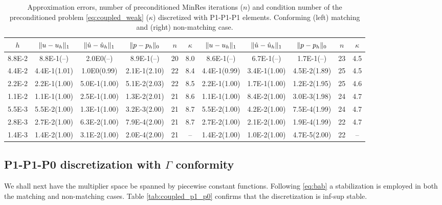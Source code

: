 \documentclass[r]{siamart171218}
\begin{document}
\begin{table}
  \begin{center}
    \scriptsize{
  \begin{tabular}{c|ccc|c|c||ccc|c|c}
    \hline
    $h$ & $\lVert{u-u_h}\rVert_1$ & $\lVert{\hat{u}-\hat{u}_h}\rVert_1$ & $\lVert{p-p_h}\rVert_0$ & $n$ & $\kappa$
        & $\lVert{u-u_h}\rVert_1$ & $\lVert{\hat{u}-\hat{u}_h}\rVert_1$ & $\lVert{p-p_h}\rVert_0$ & $n$ & $\kappa$ \\
    \hline
8.8E-2 & 8.8E-1(--)   & 2.0E0(--)    & 8.9E-1(--)   & 20 & 8.0 & 8.6E-1(--)   & 6.7E-1(--)   & 1.7E-1(--)   & 23 & 4.5  \\
4.4E-2 & 4.4E-1(1.01) & 1.0E0(0.99)  & 2.1E-1(2.10) & 22 & 8.4 & 4.4E-1(0.99) & 3.4E-1(1.00) & 4.5E-2(1.89) & 25 & 4.5  \\
2.2E-2 & 2.2E-1(1.00) & 5.0E-1(1.00) & 5.1E-2(2.03) & 22 & 8.5 & 2.2E-1(1.00) & 1.7E-1(1.00) & 1.2E-2(1.95) & 25 & 4.6  \\
1.1E-2 & 1.1E-1(1.00) & 2.5E-1(1.00) & 1.3E-2(2.01) & 21 & 8.6 & 1.1E-1(1.00) & 8.4E-2(1.00) & 3.0E-3(1.98) & 24 & 4.7  \\
5.5E-3 & 5.5E-2(1.00) & 1.3E-1(1.00) & 3.2E-3(2.00) & 21 & 8.7 & 5.5E-2(1.00) & 4.2E-2(1.00) & 7.5E-4(1.99) & 24 & 4.7  \\
2.8E-3 & 2.7E-2(1.00) & 6.3E-2(1.00) & 7.9E-4(2.00) & 21 & 8.7 & 2.7E-2(1.00) & 2.1E-2(1.00) & 1.9E-4(1.99) & 22 & 4.7  \\
1.4E-3 & 1.4E-2(1.00) & 3.1E-2(1.00) & 2.0E-4(2.00) & 21 & --  & 1.4E-2(1.00) & 1.0E-2(1.00) & 4.7E-5(2.00) & 22 & --   \\
    \hline
  \end{tabular}
    }
    \caption{Approximation errors, number of preconditioned MinRes iterations ($n$) and
      condition number of the preconditioned problem \eqref{eq:coupled_weak} ($\kappa$) discretized
      with P1-P1-P1 elements. Conforming (left) matching and (right) non-matching case.}
  \label{tab:coupled_p1_p1}
  \end{center}
\end{table}


\subsection{P1-P1-P0 discretization with $\Gamma$ conformity} 
We shall next have the multiplier space be spanned by piecewise constant
functions. Following \eqref{eq:bab} a stabilization \cite{burman2014projection}
is employed in both the matching and non-matching cases. Table \ref{tab:coupled_p1_p0}
confirms that the discretization is inf-sup stable. 
\end{document}
